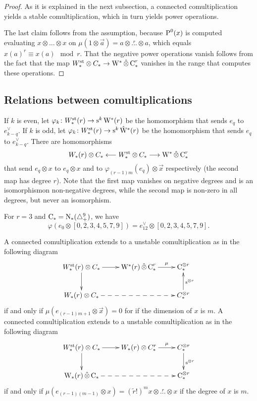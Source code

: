 \begin{proof}
    As it is explained in the next subsection, a connected comultiplication yields a stable comultiplication, which in turn yields power operations. 

    The last claim follows from the assumption, because $\operatorname{P}^0(x)$ is computed evaluating $x\otimes \ldots\otimes x$ on $\mu(1 \otimes \vec{a}) = a\otimes\overset{r}{\ldots}\otimes a$, which equals $x(a)^{r} \equiv x(a) \mod r$. That the negative power operations vanish follows from the fact that the map $W_*^{\mathrm{st}}\otimes C_*\to \mathrm{W}^*\operatorname{\hat{\otimes}} \operatorname{C}_*^r$ vanishes in the range that computes these operations.
\end{proof}



\subsection{Relations between comultiplications}
If $k$ is even, let $\varphi_k\colon W^{\mathrm{st}}_*(r)\to \operatorname{s}^{k}\mathrm{W}^*(r)$ be the homomorphism that sends $e_q$ to $e_{k-q}^{\vee}$. If $k$ is odd, let $\varphi_k\colon W^{\mathrm{st}}_*(r)\to \operatorname{s}^{k}\hat{\mathrm{W}}^*(r)$ be the homomorphism that sends $e_q$ to $e_{k-q}^{\vee}$. There are homomorphisms
\[
    W_*(r)\otimes C_* \longleftarrow W^{\mathrm{st}}_*\otimes C_*\longrightarrow \mathrm{W}^*\operatorname{\hat{\otimes}} \operatorname{C}_*^r 
\]
that send $e_q\otimes x$ to $e_q\otimes x$ and to $\varphi_{(r-1)m}(e_q)\otimes \vec{x}$ respectively (the second map has degree $r$). Note that the first map vanishes on negative degrees and is an isomorphismon non-negative degrees, while the second map is non-zero in all degrees, but never an isomorphism.

\begin{example}\label{ex:105} For $r=3$ and $\operatorname{C}_*= \operatorname{N}_*(\triangle_{+}^9)$, we have
\[
    \varphi(e_0\otimes [0,2,3,4,5,7,9]) = e^\vee_{12}\otimes [0,2,3,4,5,7,9].
\]
\end{example}


A connected comultiplication extends to a unstable comultiplication as in the following diagram
\[
    \xymatrix{
        W_*^{\st}(r)\otimes C_*\ar[r]\ar[d] & \rW^*(r)\hotimes \uchains_*^r \ar[r]^-{\mu} & \uchains_*^{\otimes r} \\
        W_*(r)\otimes C_*\ar@{-->}[rr] & & C_*^{\otimes r} \ar[u]_{\sus{\otimes r}}
    }
\]
if and only if $\mu(e_{(r-1)m+1}\otimes\vec{x}) = 0$ for if the dimension of $x$ is $m$. A connected comultiplication extends to a unstable comultiplication as in the following diagram
\[
    \xymatrix{
        W_*^{\st}(r)\otimes C_*\ar[r]\ar[d] & W_*(r)\otimes C_*^r \ar[r]^-{\mu} & C_*^{\otimes r} \ar[d]^{\sus{\otimes r}} \\
        \rW_*(r)\hotimes \uchains_*\ar@{-->}[rr] & & \uchains_*^{\otimes r} 
    }
\]
if and only if $\mu(e_{(r-1)(m-1)}\otimes x) = (\tilde{r}!)^mx\otimes \overset{r}{\ldots} \otimes x$ if the degree of $x$ is $m$.%







